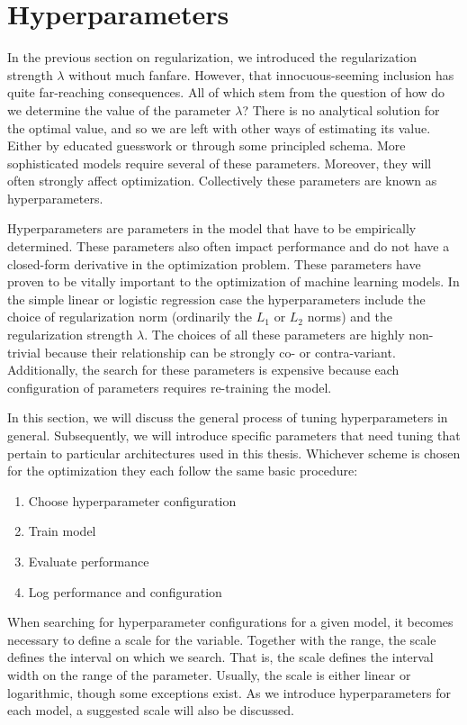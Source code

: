 \section{Hyperparameters}\label{sec:hyperparams}

In the previous section on regularization, we introduced the regularization strength $\lambda$ without much fanfare. However, that innocuous-seeming inclusion has quite far-reaching consequences. All of which stem from the question of how do we determine the value of the parameter $\lambda$? There is no analytical solution for the optimal value, and so we are left with other ways of estimating its value. Either by educated guesswork or through some principled schema. More sophisticated models require several of these parameters. Moreover, they will often strongly affect optimization. Collectively these parameters are known as hyperparameters.

Hyperparameters are parameters in the model that have to be empirically determined. These parameters also often impact performance and do not have a closed-form derivative in the optimization problem. These parameters have proven to be vitally important to the optimization of machine learning models. In the simple linear or logistic regression case the hyperparameters include the choice of regularization norm (ordinarily the $L_1$ or $L_2$ norms) and the regularization strength $\lambda$. The choices of all these parameters are highly non-trivial because their relationship can be strongly co- or contra-variant. Additionally, the search for these parameters is expensive because each configuration of parameters requires re-training the model.

In this section, we will discuss the general process of tuning hyperparameters in general. Subsequently,  we will introduce specific parameters that need tuning that pertain to particular architectures used in this thesis. Whichever scheme is chosen for the optimization they each follow the same basic procedure:

\begin{enumerate}
\item Choose hyperparameter configuration
\item Train model
\item Evaluate performance
\item Log performance and configuration
\end{enumerate}

\noindent When searching for hyperparameter configurations for a given model, it becomes necessary to define a scale for the variable. Together with the range, the scale defines the interval on which we search. That is, the scale defines the interval width on the range of the parameter. Usually, the scale is either linear or logarithmic, though some exceptions exist. As we introduce hyperparameters for each model, a suggested scale will also be discussed.


